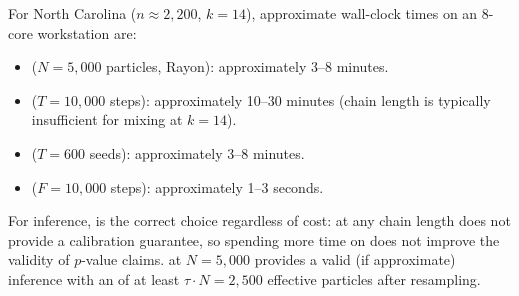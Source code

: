 For North Carolina ($n \approx 2{,}200$, $k = 14$), approximate wall-clock
times on an 8-core workstation are:
\begin{itemize}
  \item \smc{} ($N = 5{,}000$ particles, Rayon): approximately 3--8 minutes.
  \item \recom{} ($T = 10{,}000$ steps): approximately 10--30 minutes
        (chain length is typically insufficient for mixing at $k = 14$).
  \item \cs{} ($T = 600$ seeds): approximately 3--8 minutes.
  \item \flip{} ($F = 10{,}000$ steps): approximately 1--3 seconds.
\end{itemize}

For inference, \smc{} is the correct choice regardless of cost: \recom{} at
any chain length does not provide a calibration guarantee, so spending more
time on \recom{} does not improve the validity of $p$-value claims.
\smc{} at $N = 5{,}000$ provides a valid (if approximate) inference with
an \ess{} of at least $\tau \cdot N = 2{,}500$ effective particles after
resampling.
